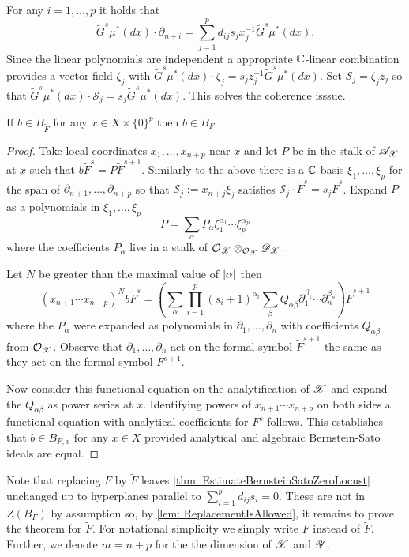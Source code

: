 For any $i=1,\ldots,p$ it holds that
$$\widetilde{G}^s \mu^*(dx)\cdot \partial_{n+i} = \sum_{j=1}^p d_{ij}s_j x_j^{-1} \widetilde{G}^s \mu^*(dx).$$
Since the linear polynomials are independent a appropriate $\mathbb{C}$-linear combination provides a vector field $\zeta_j$ with $\widetilde{G}^s \mu^*(dx)\cdot \zeta_j = s_{j}z_j^{-1}\widetilde{G}^s \mu^*(dx)$.
Set $\mathcal{S}_j = \zeta_jz_j$ so that $\widetilde{G}^s \mu^*(dx) \cdot \mathcal{S}_j = s_j \widetilde{G}^s \mu^*(dx) $.
This solves the coherence isssue.
\begin{lemma}\label{lem: ReplacementIsAllowed}
  If $b\in B_{\widetilde{F}}$ for any $x\in X\times \{0\}^p$ then $b \in B_F$.
\end{lemma}
\begin{proof}
  Take local coordinates $x_1,\ldots, x_{n+p}$ near $x$ and let $P$ be in the stalk of $\mathscr{A}_{\mathscr{X}}$ at $x$ such that $b \widetilde{F}^s = P \widetilde{F}^{s+1}$.
  Similarly to the above there is a $\mathbb{C}$-basis $\xi_1,\ldots,\xi_p$ for the span of $\partial_{n+1}, \ldots, \partial_{n+p}$ so that $\mathcal{S}_j := x_{n+j}\xi_j$ satisfies $\mathcal{S}_j \cdot \widetilde{F}^s = s_{j}\widetilde{F}^s$.
  Expand $P$ as a polynomials in $\xi_1,\ldots,\xi_p$
  $$P = \sum_{\alpha} P_\alpha \xi_{1}^{\alpha_1}\cdots \xi_{p}^{\alpha_p}$$
  where the coefficients $P_\alpha$ live in a stalk of $\mathcal{O}_{\mathscr{X}}\otimes_{\mathcal{O}_{\mathscr{X}}}\mathscr{D}_{\mathscr{X}}$.

  Let $N$ be greater than the maximal value of $\vert \alpha \vert$ then
  $$(x_{n+1}\cdots x_{n+p})^N b \widetilde{F}^s = \left(\sum_{\alpha} \prod_{i=1}^p (s_i + 1)^{\alpha_i} \sum_\beta Q_{\alpha\beta} \partial_1^{\beta_1}\cdots \partial_n^{\beta_n} \right)\widetilde{F}^{s+1}$$
  where the $P_\alpha$ were expanded as polynomials in $\partial_1,\ldots,\partial_n$ with coefficients $Q_{\alpha\beta}$ from $\mathcal{O}_{\mathscr{X}}$.
  Observe that $\partial_1,\ldots, \partial_n$ act on the formal symbol $\widetilde{F}^{s+1}$ the same as they act on the formal symbol $F^{s+1}$.

  Now consider this functional equation on the analytification of $\mathscr{X}$ and expand the $Q_{\alpha\beta}$ as power series at $x$.
  Identifying powers of $x_{n+1}\cdots x_{n+p}$ on both sides a functional equation with analytical coefficients for $F^s$ follows.
  This establishes that $b \in B_{F,x}$ for any $x\in X$ provided analytical and algebraic Bernstein-Sato ideals are equal.
\end{proof}
Note that replacing $F$ by $\widetilde{F}$ leaves \cref{thm: EstimateBernsteinSatoZeroLocust} unchanged up to hyperplanes parallel to $\sum_{i=1}^p d_{ij}s_i = 0$.
These are not in $Z(B_F)$ by assumption so, by \cref{lem: ReplacementIsAllowed}, it remains to prove the theorem for $\widetilde{F}$.
For notational simplicity we simply write $F$ instead of $\widetilde{F}$.
Further, we denote $m = n+p$ for the the dimension of $\mathscr{X}$ and $\mathscr{Y}$.

